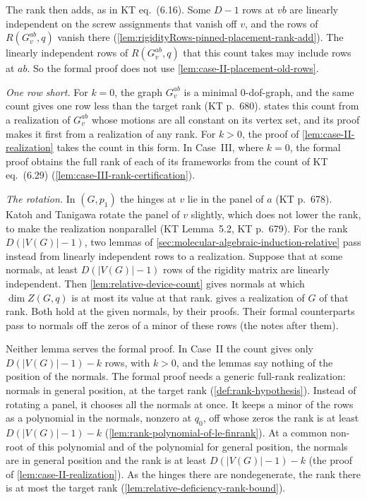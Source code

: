 \begin{remark}
  The rank then adds, as in KT eq.~(6.16). Some $D - 1$ rows at $vb$ are
  linearly independent on the screw assignments that vanish off $v$,
  and the rows of $R(G_v^{ab}, q)$ vanish there
  (\cref{lem:rigidityRows-pinned-placement-rank-add}). The linearly
  independent rows of $R(G_v^{ab}, q)$ that this count takes may include
  rows at $ab$. So the formal proof does not use
  \cref{lem:case-II-placement-old-rows}.

  \emph{One row short.} For $k = 0$, the graph $G_v^{ab}$ is a minimal
  $0$-dof-graph, and the same count gives one row less than the target
  rank (KT p.~680).  states this
  count from a realization of $G_v^{ab}$ whose motions are all constant
  on its vertex set, and its proof makes it first from a realization of
  any rank. For $k > 0$, the proof of \cref{lem:case-II-realization}
  takes the count in this form. In Case~III,
  where $k = 0$, the formal proof obtains the full rank of each of its
  frameworks from the count of KT eq.~(6.29)
  (\cref{lem:case-III-rank-certification}).

  \emph{The rotation.} In $(G, p_1)$ the hinges at $v$ lie in the panel
  of $a$ (KT p.~678). Katoh and Tanigawa rotate the panel of $v$ slightly, which
  does not lower the rank, to make the realization nonparallel (KT
  Lemma~5.2, KT p.~679). For the rank $D(|V(G)| - 1)$, two lemmas of
  \cref{sec:molecular-algebraic-induction-relative} pass instead from
  linearly independent rows to a realization. Suppose that at some
  normals, at least $D(|V(G)| - 1)$ rows of the rigidity matrix are
  linearly independent. Then \cref{lem:relative-device-count} gives
  normals at which $\dim Z(G,q)$ is at most its value at that rank.  gives a realization
  of $G$ of that rank. Both hold at the given normals, by their proofs.
  Their formal counterparts pass to normals off the zeros of a minor of
  these rows (the notes after them).

  Neither lemma serves the formal proof. In Case~II the count gives
  only $D(|V(G)| - 1) - k$ rows, with $k > 0$, and the lemmas say
  nothing of the position of the normals. The formal proof needs a
  generic full-rank realization: normals in general position, at the
  target rank (\cref{def:rank-hypothesis}). Instead of rotating a panel,
  it chooses all the normals at once. It keeps a minor of the rows as a
  polynomial in the normals, nonzero at $q_0$, off whose zeros the rank
  is at least $D(|V(G)| - 1) - k$
  (\cref{lem:rank-polynomial-of-le-finrank}). At a common non-root of
  this polynomial and of the polynomial for general position, the
  normals are in general position and the rank is at least
  $D(|V(G)| - 1) - k$ (the proof of \cref{lem:case-II-realization}).
  As the hinges there are nondegenerate, the rank there is at most the
  target rank (\cref{lem:relative-deficiency-rank-bound}).
\end{remark}

